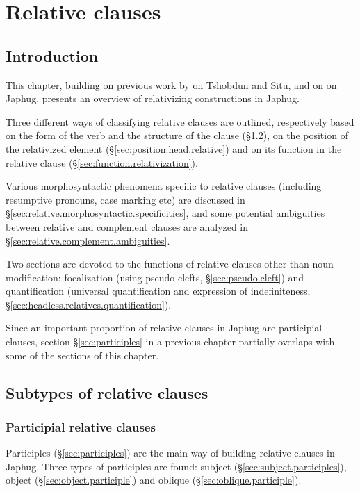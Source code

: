 \chapter{Relative clauses} \label{chap:relatives}
\section{Introduction}
This chapter, building on previous work by \citet{jackson06guanxiju, jacksonlin07} on Tshobdun and Situ, and on \citet{jacques16relatives} on Japhug, presents an overview of relativizing constructions in Japhug. 

Three different ways of classifying relative clauses are outlined, respectively based on the form of the verb and the structure of the clause (§\ref{sec:relative.subtypes}), on the position of the relativized element (§\ref{sec:position.head.relative}) and on its function in the relative clause (§\ref{sec:function.relativization}). 

Various morphosyntactic phenomena specific to relative clauses (including resumptive pronouns, case marking etc) are discussed in §\ref{sec:relative.morphosyntactic.specificities}, and some potential ambiguities between relative and complement clauses are analyzed in §\ref{sec:relative.complement.ambiguities}.

Two sections are devoted to the functions of relative clauses other than noun modification: focalization (using pseudo-clefts, §\ref{sec:pseudo.cleft}) and quantification (universal quantification and expression of indefiniteness, §\ref{sec:headless.relatives.quantification}).

Since an important proportion of relative clauses in Japhug are participial clauses, section §\ref{sec:participles} in a previous chapter partially overlaps with some of the sections of this chapter.

\section{Subtypes of relative clauses} \label{sec:relative.subtypes}
\subsection{Participial relative clauses} \label{sec:participial.relatives}
Participles (§\ref{sec:participles}) are the main way of building relative clauses in Japhug. Three types of participles are found: subject  (§\ref{sec:subject.participles}), object  (§\ref{sec:object.participle}) and oblique  (§\ref{sec:oblique.participle}).

